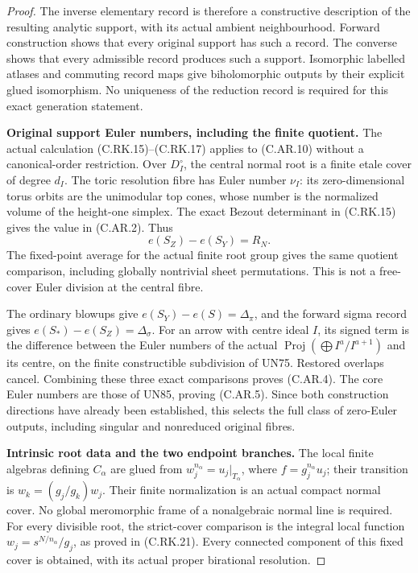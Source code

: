 \begin{proof}
The inverse elementary record is therefore
a constructive description of the resulting
analytic support, with its actual ambient
neighbourhood. Forward construction shows
that every original support has such a
record. The converse shows that every
admissible record produces such a support.
Isomorphic labelled atlases and commuting
record maps give biholomorphic outputs
by their explicit glued isomorphism.
No uniqueness of the reduction record is
required for this exact generation statement.

\par\medskip\noindent\textbf{Original support Euler numbers, including the finite quotient.}
The actual calculation (C.RK.15)--(C.RK.17)
applies to (C.AR.10) without a canonical-order
restriction. Over \(D_I^\circ\), the central
normal root is a finite etale cover of degree
\(d_I\). The toric resolution fibre has Euler
number \(\nu_I\): its zero-dimensional torus
orbits are the unimodular top cones, whose
number is the normalized volume of the
height-one simplex. The exact Bezout
determinant in (C.RK.15) gives the value
in (C.AR.2). Thus
\[
       e(S_Z)-e(S_Y)=R_N.
 \tag{C.AR.14}
\]
The fixed-point average for the actual
finite root group gives the same quotient
comparison, including globally nontrivial
sheet permutations. This is not a free-cover
Euler division at the central fibre.

The ordinary blowups give
\(e(S_Y)-e(S)=\Delta_\pi\), and the
forward sigma record gives
\(e(S_*)-e(S_Z)=\Delta_\sigma\).
For an arrow with centre ideal \(I\),
its signed term is the difference between
the Euler numbers of the actual
\(\operatorname{Proj}(\bigoplus I^a/I^{a+1})\)
and its centre, on the finite constructible
subdivision of UN75. Restored overlaps
cancel. Combining these three exact
comparisons proves (C.AR.4). The core
Euler numbers are those of UN85, proving
(C.AR.5). Since both construction
directions have already been established,
this selects the full class of zero-Euler
outputs, including singular and nonreduced
original fibres.

\par\medskip\noindent\textbf{Intrinsic root data and the two endpoint branches.}
The local finite algebras defining
\(C_\alpha\) are glued from
\(w_j^{n_\alpha}=u_j|_{T_\alpha}\), where
\(f=g_j^{n_\alpha}u_j\); their transition
is \(w_k=(g_j/g_k)w_j\). Their finite
normalization is an actual compact
normal cover. No global meromorphic
frame of a nonalgebraic normal line
is required. For every divisible
root, the strict-cover comparison is
the integral local function
\(w_j=s^{N/n_\alpha}/g_j\), as proved
in (C.RK.21). Every connected component
of this fixed cover is obtained, with
its actual proper birational resolution.


\end{proof}
